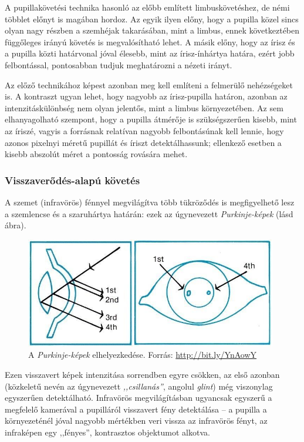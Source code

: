 A pupillakövetési technika hasonló az előbb említett limbuskövetéshez, de némi többlet előnyt is magában hordoz. Az egyik ilyen előny, hogy a pupilla közel sincs olyan nagy részben a szemhéjak takarásában, mint a limbus, ennek következtében függőleges irányú követés is megvalósítható lehet. A másik előny, hogy az írisz és a pupilla közti határvonal jóval élesebb, mint az írisz-ínhártya határa, ezért jobb felbontással, pontosabban tudjuk meghatározni a nézeti irányt.

Az előző technikához képest azonban meg kell említeni a felmerülő nehézségeket is. A kontraszt ugyan lehet, hogy nagyobb az írisz-pupilla határon, azonban az intenzitáskülönbség nem olyan jelentős, mint a limbus környezetében. Az sem elhanyagolható szempont, hogy a pupilla átmérője is szükségszerűen kisebb, mint az íriszé, vagyis a forrásnak relatívan nagyobb felbontásúnak kell lennie, hogy azonos pixelnyi méretű pupillát és íriszt detektálhassunk; ellenkező esetben a kisebb abszolút méret a pontosság rovására mehet.

\subsubsection{Visszaverődés-alapú követés}\label{sect:visszaverodes}

A szemet (infravörös) fénnyel megvilágítva több tükröződés is megfigyelhető lesz a szemlencse és a szaruhártya határán: ezek az úgynevezett \emph{Purkinje-képek} (lásd  ábra).

\begin{figure}[!ht]
\centering
\includegraphics[width=110mm, keepaspectratio]{figures/purkinje_kepek.png}
\caption{A \emph{Purkinje-képek} elhelyezkedése. Forrás: \url{http://bit.ly/YnAowY}}
\label{fig:purkinje}
\end{figure}

Ezen visszavert képek intenzitása sorrendben egyre csökken, az első azonban (közkeletű nevén az úgynevezett \emph{,,csillanás''}, angolul \emph{glint}) még viszonylag egyszerűen detektálható. Infravörös megvilágításban ugyancsak egyszerű a megfelelő kamerával a pupilláról visszavert fény detektálása -- a pupilla a környezeténél jóval nagyobb mértékben veri vissza az infravörös fényt, az infraképen egy ,,fényes'', kontrasztos objektumot alkotva.

